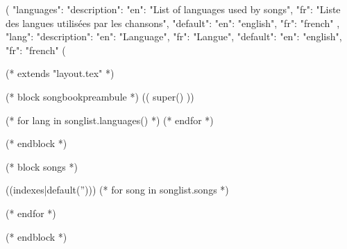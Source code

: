 (%
{
"languages": {"description": {"en": "List of languages used by songs", "fr": "Liste des langues utilisées par les chansons"},
              "default": {"en": "english", "fr": "french"}
           },
"lang": {"description": {"en": "Language", "fr": "Langue"},
         "default": {"en": "english", "fr": "french"}
      }
}
(%

(* extends "layout.tex" *)

(* block songbookpreambule *)
   (( super() ))


   (* for lang in songlist.languages() *)
   (* endfor *)
   \usepackage[((lang))]{babel}

   \graphicspath{{((datadir))/img/}}
(* endblock *)

(* block songs *)

   \begin{songs}{((indexes|default('')))}
      (* for song in songlist.songs *)
      
      (* endfor *)
   \end{songs}
(* endblock *)
